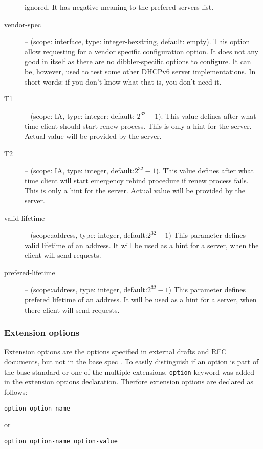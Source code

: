 \begin{description}
   ignored. It has negative meaning to the prefered-servers list.
 \item[vendor-spec] -- (scope: interface, type: integer-hexstring,
   default: empty). This option allow requesting for a vendor specific
   configuration option. It does not any good in itself as there are
   no dibbler-specific options to configure. It can be, however, used
   to test some other DHCPv6 server implementations. In short words:
   if you don't know what that is, you don't need it.
 \item[T1] -- (scope: IA, type: integer: default: $2^{32}-1$). This
   value defines after what time client should start renew
   process. This is only a hint for the server. Actual value will be
   provided by the server.
 \item[T2] -- (scope: IA, type: integer, default:$2^{32}-1$). This
   value defines after what time client will start emergency rebind
   procedure if renew process fails. This is only a hint for the
   server. Actual value will be provided by the server.
 \item[valid-lifetime] -- (scope:address, type: integer,
   default:$2^{32}-1$) This parameter defines valid lifetime of an
   address. It will be used as a hint for a server, when the client
   will send requests.
 \item[prefered-lifetime] -- (scope:address, type: integer,
   default:$2^{32}-1$) This parameter defines prefered lifetime of an
   address. It will be used as a hint for a server, when there client
   will send requests.
\end{description}

\subsubsection{Extension options}
\label{client-conf-extension}
Extension options are the options specified in external drafts and RFC
documents, but not in the base spec \cite{rfc3315}. To easily
distinguish if an option is part of the base standard or one of the
multiple extensions, \verb+option+ keyword was added in the extension
options declaration. Therfore extension options are declared as
follows:

\begin{verbatim}
option option-name
\end{verbatim}

or

\begin{verbatim}
option option-name option-value
\end{verbatim}

